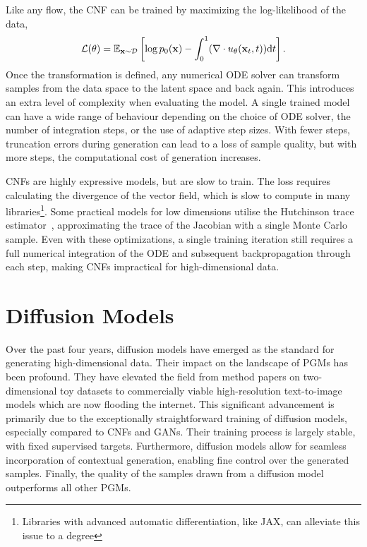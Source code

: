 Like any flow, the \Gls{CNF} can be trained by maximizing the log-likelihood of the data,
\begin{equation}
    \label{eq:cnf_loss}
    \mathcal{L}(\theta) = \mathbb{E}_{\mathbf{x} \sim \mathcal{D}}\left[\log p_0(\mathbf{x}) - \int_0^1 (\nabla \cdot u_\theta(\mathbf{x}_t, t)) \mathrm{d} t\right].
\end{equation}
Once the transformation is defined, any numerical \Gls{ODE} solver can transform samples from the data space to the latent space and back again.
This introduces an extra level of complexity when evaluating the model.
A single trained model can have a wide range of behaviour depending on the choice of \Gls{ODE} solver, the number of integration steps, or the use of adaptive step sizes.
With fewer steps, truncation errors during generation can lead to a loss of sample quality, but with more steps, the computational cost of generation increases.

\Glspl{CNF} are highly expressive models, but are slow to train.
The loss requires calculating the divergence of the vector field, which is slow to compute in many libraries\footnote{Libraries with advanced automatic differentiation, like JAX\cite{JAX}, can alleviate this issue to a degree}.
Some practical models for low dimensions utilise the Hutchinson trace estimator~\cite{FFJORD},  approximating the trace of the Jacobian with a single Monte Carlo sample.
Even with these optimizations, a single training iteration still requires a full numerical integration of the \Gls{ODE} and subsequent backpropagation through each step, making \Glspl{CNF} impractical for high-dimensional data.


\section{Diffusion Models}

Over the past four years, diffusion models have emerged as the standard for generating high-dimensional data.
Their impact on the landscape of \Glspl{PGM} has been profound.
They have elevated the field from method papers on two-dimensional toy datasets to commercially viable high-resolution text-to-image models which are now flooding the internet.
This significant advancement is primarily due to the exceptionally straightforward training of diffusion models, especially compared to \Glspl{CNF} and \Glspl{GAN}.
Their training process is largely stable, with fixed supervised targets.
Furthermore, diffusion models allow for seamless incorporation of contextual generation, enabling fine control over the generated samples.
Finally, the quality of the samples drawn from a diffusion model outperforms all other \Glspl{PGM}.


